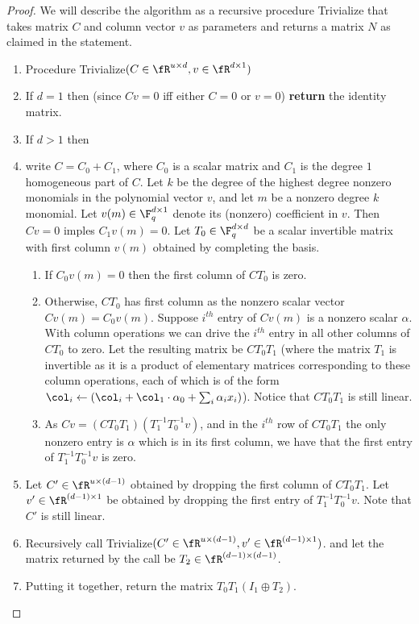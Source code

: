 \begin{proof}
 We will describe the algorithm as a recursive procedure Trivialize
 that takes matrix $C$ and column vector $v$ as parameters and returns
 a matrix $N$ as claimed in the statement.

  \begin{enumerate}
  \item[] Procedure Trivialize$(C\in\fR^{u\times d},v\in\fR^{d\times 1})$
  \item If $d=1$ then (since $Cv=0$ iff either $C=0$ or $v=0$)
    \textbf{return} the identity matrix.
  \item  If $d>1$ then
  \item write $C=C_0+C_1$, where $C_0$ is a scalar matrix and $C_1$ is the
    degree $1$ homogeneous part of $C$. Let $k$ be the degree of the
    highest degree nonzero monomials in the polynomial vector $v$, and
    let $m$ be a nonzero degree $k$ monomial. Let
    $v(m)\in\F_q^{d\times 1}$ denote its (nonzero) coefficient in $v$.
    Then $Cv=0$ imples $C_1 v(m)=0$. Let $T_0\in\F_q^{d\times d}$ be a
    scalar invertible matrix with first column $v(m)$ obtained by
    completing the basis.
    \begin{enumerate}
    \item If $C_0v(m)=0$ then the first column of $CT_0$ is zero.
    \item Otherwise, $CT_0$ has first column as the nonzero scalar
      vector $Cv(m)=C_0v(m)$. Suppose $i^{th}$ entry of $Cv(m)$ is a
      nonzero scalar $\alpha$. With column operations we can drive the
      $i^{th}$ entry in all other columns of $CT_0$ to zero. Let the
      resulting matrix be $CT_0T_1$ (where the matrix $T_1$ is
      invertible as it is a product of elementary matrices
      corresponding to these column operations, each of which is of
      the form $\col_i\leftarrow (\col_i +
      \col_1\cdot \alpha_0+\sum_i \alpha_i x_i)$). Notice that $CT_0T_1$ is still
      linear.
    \item As $Cv=(CT_0T_1)(T_1^{-1}T_0^{-1}v)$, and in the $i^{th}$
      row of $CT_0T_1$ the only nonzero entry is $\alpha$ which is in
      its first column, we have that the first entry of
      $T_1^{-1}T_0^{-1}v$ is zero.
    \end{enumerate}
  \item Let $C'\in\fR^{u\times (d-1)}$ obtained by dropping the first
    column of $CT_0T_1$. Let $v'\in\fR^{(d-1)\times 1}$ be obtained by
    dropping the first entry of $T_1^{-1}T_0^{-1}v$. Note that $C'$
    is still linear.
  \item Recursively call Trivialize$(C'\in\fR^{u\times
    (d-1)},v'\in\fR^{(d-1)\times 1})$.  and let the matrix returned by
    the call be $T_2\in\fR^{(d-1)\times (d-1)}$.
  \item Putting it together, return the matrix $T_0T_1(I_1\oplus T_2)$.
  \end{enumerate}


\end{proof}
